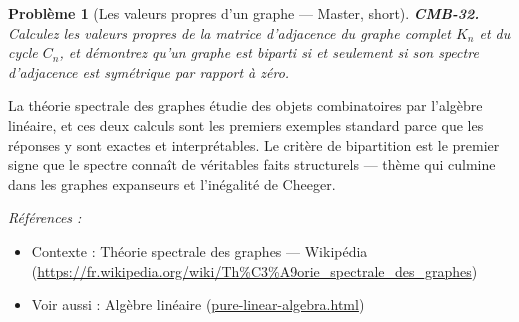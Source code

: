 \documentclass[11pt]{article}
\newtheorem{problem}{Problème}
\newenvironment{refs}{\par\small\noindent\emph{Références :}\begin{itemize}\setlength\itemsep{0pt}}{\end{itemize}\normalsize}
\begin{document}
\bigskip

\begin{problem}[{Les valeurs propres d'un graphe --- Master, short}]
\textbf{CMB-32.} Calculez les valeurs propres de la matrice d'adjacence du graphe complet $ K_n $ et du cycle $ C_n $, et démontrez qu'un graphe est biparti si et seulement si son spectre d'adjacence est symétrique par rapport à zéro.
\end{problem}

\noindent La théorie spectrale des graphes étudie des objets combinatoires par l'algèbre linéaire, et ces deux calculs sont les premiers exemples standard parce que les réponses y sont exactes et interprétables. Le critère de bipartition est le premier signe que le spectre connaît de véritables faits structurels --- thème qui culmine dans les graphes expanseurs et l'inégalité de Cheeger.

\begin{refs}
\item Contexte : Théorie spectrale des graphes --- Wikipédia (\url{https://fr.wikipedia.org/wiki/Th%C3%A9orie_spectrale_des_graphes})
\item Voir aussi : Algèbre linéaire (\url{pure-linear-algebra.html})
\end{refs}

\bigskip
\end{document}
